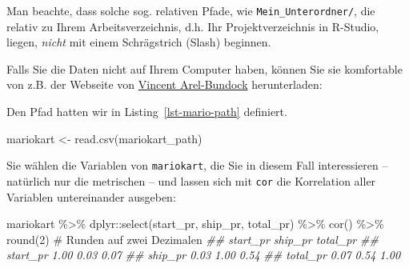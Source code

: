 \documentclass[
  letterpaper,
]{scrbook}
\newenvironment{Shaded}{\begin{snugshade}}{\end{snugshade}}
\newcommand{\CommentTok}[1]{\textcolor[rgb]{0.37,0.37,0.37}{#1}}
\newcommand{\DecValTok}[1]{\textcolor[rgb]{0.68,0.00,0.00}{#1}}
\newcommand{\DocumentationTok}[1]{\textcolor[rgb]{0.37,0.37,0.37}{\textit{#1}}}
\newcommand{\FunctionTok}[1]{\textcolor[rgb]{0.28,0.35,0.67}{#1}}
\newcommand{\NormalTok}[1]{\textcolor[rgb]{0.00,0.23,0.31}{#1}}
\newcommand{\OtherTok}[1]{\textcolor[rgb]{0.00,0.23,0.31}{#1}}
\newcommand{\SpecialCharTok}[1]{\textcolor[rgb]{0.37,0.37,0.37}{#1}}
\theoremstyle{definition}
\theoremstyle{definition}
\theoremstyle{definition}
\theoremstyle{remark}
\begin{document}
Man beachte, dass solche sog. relativen Pfade, wie
\texttt{Mein\_Unterordner/}, die relativ zu Ihrem Arbeitsverzeichnis,
d.h. Ihr Projektverzeichnis in R-Studio, liegen, \emph{nicht} mit einem
Schrägstrich (Slash) beginnen.

Falls Sie die Daten nicht auf Ihrem Computer haben, können Sie sie
komfortable von z.B. der Webseite von
\href{https://vincentarelbundock.github.io/Rdatasets}{Vincent
Arel-Bundock} herunterladen:

Den Pfad hatten wir in Listing~\ref{lst-mario-path} definiert.

\begin{Shaded}
\begin{Highlighting}[]
\NormalTok{mariokart }\OtherTok{\textless{}{-}} \FunctionTok{read.csv}\NormalTok{(mariokart\_path)}
\end{Highlighting}
\end{Shaded}

Sie wählen die Variablen von \texttt{mariokart}, die Sie in diesem Fall
interessieren -- natürlich nur die metrischen -- und lassen sich mit
\texttt{cor} die Korrelation aller Variablen untereinander ausgeben:

\begin{Shaded}
\begin{Highlighting}[]
\NormalTok{mariokart }\SpecialCharTok{\%\textgreater{}\%}  
\NormalTok{  dplyr}\SpecialCharTok{::}\FunctionTok{select}\NormalTok{(start\_pr, ship\_pr, total\_pr) }\SpecialCharTok{\%\textgreater{}\%} 
  \FunctionTok{cor}\NormalTok{() }\SpecialCharTok{\%\textgreater{}\%} 
  \FunctionTok{round}\NormalTok{(}\DecValTok{2}\NormalTok{) }\CommentTok{\# Runden auf zwei Dezimalen}
\DocumentationTok{\#\#          start\_pr ship\_pr total\_pr}
\DocumentationTok{\#\# start\_pr     1.00    0.03     0.07}
\DocumentationTok{\#\# ship\_pr      0.03    1.00     0.54}
\DocumentationTok{\#\# total\_pr     0.07    0.54     1.00}
\end{Highlighting}
\end{Shaded}
\end{document}

